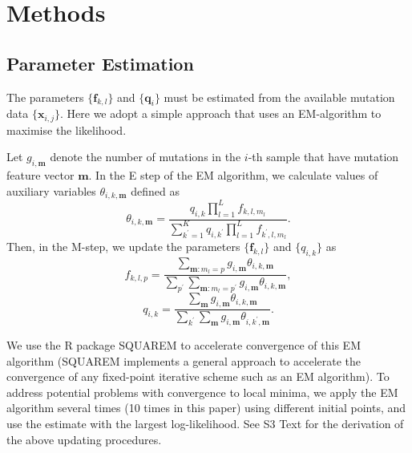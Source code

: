 \documentclass[10pt,letterpaper]{article}
\begin{document}
\section*{Methods}




\subsection*{Parameter Estimation}

The parameters $\{ \bm{f}_{k, l} \}$ and $\{ \bm{q}_i \}$
must be estimated from the available mutation data $\{ \bm{x}_{i,j} \}$. 
Here we adopt a simple approach that uses an EM-algorithm to maximise the likelihood. 

Let $g_{i, \bm{m}}$ denote the number of mutations in the $i$-th sample that have mutation feature vector $\bm{m}$.
In the E step of the EM algorithm, we calculate values of auxiliary variables $\theta_{i, k, \bm{m}}$ defined as
\begin{equation}
\theta_{i, k, \bm{m}} = \frac{  q_{i,k} \prod_{l=1}^L f_{k,l,m_l} }{ \sum_{k^{\prime} = 1}^K q_{i, k^{\prime} } \prod_{l=1}^L f_{k^{\prime}, l, m_l } }.
\end{equation}
Then, in the M-step, we update the parameters $\{ \bm{f}_{k, l} \}$ and $\{ q_{i, k} \}$ as
\begin{equation}
f_{k, l, p} = \frac{ \sum_{\bm{m} : m_l = p} g_{i, \bm{m}} \theta_{i, k, \bm{m}} }{ \sum_{p^{\prime} } 
\sum_{\bm{m} : m_l = p^{\prime}}  g_{i, \bm{m}}\theta_{i, k, \bm{m}} },
\end{equation}
\begin{equation}
q_{i, k} = \frac{ \sum_{\bm{m}} g_{i, \bm{m}} \theta_{i, k, \bm{m} } }{  \sum_{k^{\prime} }\sum_{\bm{m}} g_{i, \bm{m}} \theta_{i, k^{\prime}, \bm{m} } }.
\end{equation}

We use the R package SQUAREM \cite{varadhan2008simple} to accelerate
convergence of this EM algorithm (SQUAREM implements a general approach to accelerate the convergence of any fixed-point iterative scheme such as an EM algorithm).
To address potential problems with convergence to local minima,
we apply the EM algorithm several times (10 times in this paper) using different initial points,
and use the estimate with the largest log-likelihood.
See S3 Text for the derivation of the above updating procedures.
\end{document}
